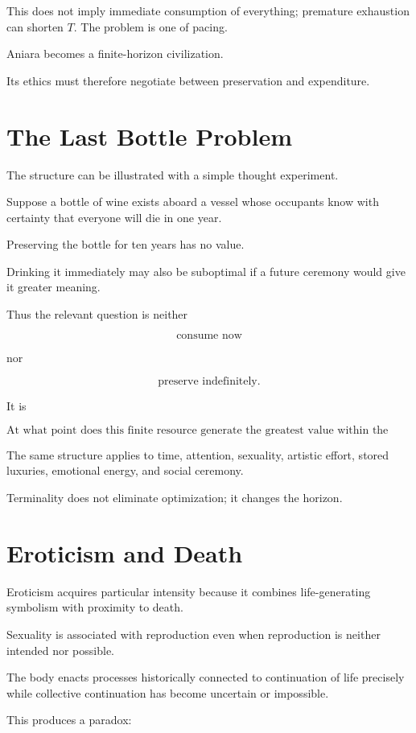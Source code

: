 \documentclass[11pt,oneside]{book}
\theoremstyle{definition}
\theoremstyle{remark}
\begin{document}
This does not imply immediate consumption of everything; premature exhaustion can shorten \(T\). The problem is one of pacing.

Aniara becomes a finite-horizon civilization.

Its ethics must therefore negotiate between preservation and expenditure.

\section{The Last Bottle Problem}

The structure can be illustrated with a simple thought experiment.

Suppose a bottle of wine exists aboard a vessel whose occupants know with certainty that everyone will die in one year.

Preserving the bottle for ten years has no value.

Drinking it immediately may also be suboptimal if a future ceremony would give it greater meaning.

Thus the relevant question is neither

\[
\text{consume now}
\]

nor

\[
\text{preserve indefinitely}.
\]

It is

\[
\text{At what point does this finite resource generate the greatest value within the reachable future?}
\]

The same structure applies to time, attention, sexuality, artistic effort, stored luxuries, emotional energy, and social ceremony.

Terminality does not eliminate optimization; it changes the horizon.

\section{Eroticism and Death}

Eroticism acquires particular intensity because it combines life-generating symbolism with proximity to death.

Sexuality is associated with reproduction even when reproduction is neither intended nor possible.

The body enacts processes historically connected to continuation of life precisely while collective continuation has become uncertain or impossible.

This produces a paradox:
\end{document}
